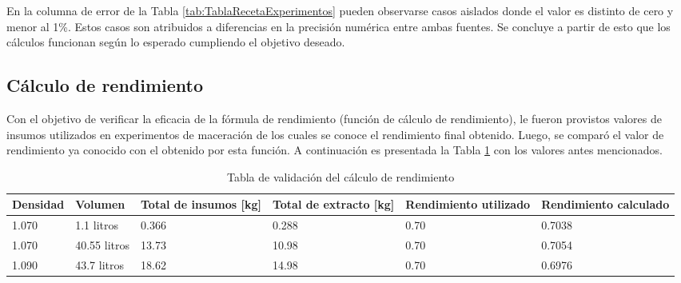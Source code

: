 
\par En la columna de error de la Tabla \ref{tab:TablaRecetaExperimentos} pueden observarse casos aislados donde el valor es distinto de cero y menor al 1\%. Estos casos son atribuidos a diferencias en la precisión numérica entre ambas fuentes. Se concluye a partir de esto que los cálculos funcionan según lo esperado cumpliendo el objetivo deseado.

\subsection{Cálculo de rendimiento}

\par Con el objetivo de verificar la eficacia de la fórmula de rendimiento (función de cálculo de rendimiento), le fueron provistos valores de insumos utilizados en experimentos de maceración de los cuales se conoce el rendimiento final obtenido. Luego, se comparó el valor de rendimiento ya conocido con el obtenido por esta función. A continuación es presentada la Tabla \ref{tab:rendimiento} con los valores antes mencionados.

\begin{table}[H]
    \centering
    \begin{tabularx}{\textwidth}{|X|X|X|X|X|X|}
        \hline
        Densidad & Volumen & Total de insumos [kg] & Total de extracto [kg] & Rendimiento utilizado & Rendimiento calculado \\
        \hline
        \hline
        1.070 & 1.1 litros & 0.366 & 0.288 & 0.70 & 0.7038\\ \hline
        1.070 & 40.55 litros & 13.73 & 10.98 & 0.70 & 0.7054 \\ \hline
        1.090 & 43.7 litros & 18.62 & 14.98 & 0.70 & 0.6976 \\ \hline
    \end{tabularx}
    \caption{Tabla de validación del cálculo de rendimiento}
    \label{tab:rendimiento}
\end{table}

